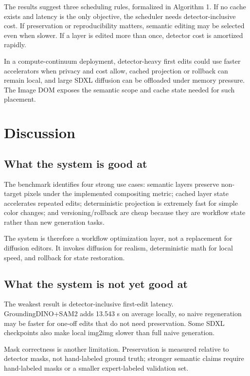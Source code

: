 \documentclass[final,5p,times,number,sort&compress]{elsarticle}
\newcommand{\imageDOM}{Image DOM}
\begin{document}
The results suggest three scheduling rules, formalized in Algorithm 1. If no cache exists and latency is the only objective, the scheduler needs detector-inclusive cost. If preservation or reproducibility matters, semantic editing may be selected even when slower. If a layer is edited more than once, detector cost is amortized rapidly.

In a compute-continuum deployment, detector-heavy first edits could use faster accelerators when privacy and cost allow, cached projection or rollback can remain local, and large SDXL diffusion can be offloaded under memory pressure. The \imageDOM{} exposes the semantic scope and cache state needed for such placement.

\section{Discussion}

\subsection{What the system is good at}

The benchmark identifies four strong use cases: semantic layers preserve non-target pixels under the implemented compositing metric; cached layer state accelerates repeated edits; deterministic projection is extremely fast for simple color changes; and versioning/rollback are cheap because they are workflow state rather than new generation tasks.

The system is therefore a workflow optimization layer, not a replacement for diffusion editors. It invokes diffusion for realism, deterministic math for local speed, and rollback for state restoration.

\subsection{What the system is not yet good at}

The weakest result is detector-inclusive first-edit latency. GroundingDINO+SAM2 adds 13.543 s on average locally, so naive regeneration may be faster for one-off edits that do not need preservation. Some SDXL checkpoints also make local img2img slower than full naive generation.

Mask correctness is another limitation. Preservation is measured relative to detector masks, not hand-labeled ground truth; stronger semantic claims require hand-labeled masks or a smaller expert-labeled validation set.
\end{document}
